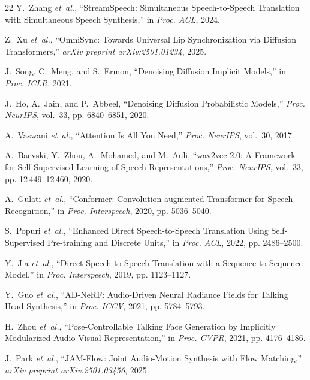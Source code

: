 \documentclass[10pt,journal,compsoc]{IEEEtran}
\begin{document}
\begin{thebibliography}{22}
Y.~Zhang \emph{et~al.}, ``StreamSpeech: Simultaneous Speech-to-Speech Translation with Simultaneous Speech Synthesis,'' in \emph{Proc. ACL}, 2024.

Z.~Xu \emph{et~al.}, ``OmniSync: Towards Universal Lip Synchronization via Diffusion Transformers,'' \emph{arXiv preprint arXiv:2501.01234}, 2025.

J.~Song, C.~Meng, and S.~Ermon, ``Denoising Diffusion Implicit Models,'' in \emph{Proc. ICLR}, 2021.

J.~Ho, A.~Jain, and P.~Abbeel, ``Denoising Diffusion Probabilistic Models,'' \emph{Proc. NeurIPS}, vol.~33, pp. 6840--6851, 2020.

A.~Vaswani \emph{et~al.}, ``Attention Is All You Need,'' \emph{Proc. NeurIPS}, vol.~30, 2017.

A.~Baevski, Y.~Zhou, A.~Mohamed, and M.~Auli, ``wav2vec 2.0: A Framework for Self-Supervised Learning of Speech Representations,'' \emph{Proc. NeurIPS}, vol.~33, pp. 12\,449--12\,460, 2020.

A.~Gulati \emph{et~al.}, ``Conformer: Convolution-augmented Transformer for Speech Recognition,'' in \emph{Proc. Interspeech}, 2020, pp. 5036--5040.

S.~Popuri \emph{et~al.}, ``Enhanced Direct Speech-to-Speech Translation Using Self-Supervised Pre-training and Discrete Units,'' in \emph{Proc. ACL}, 2022, pp. 2486--2500.

Y.~Jia \emph{et~al.}, ``Direct Speech-to-Speech Translation with a Sequence-to-Sequence Model,'' in \emph{Proc. Interspeech}, 2019, pp. 1123--1127.

Y.~Guo \emph{et~al.}, ``AD-NeRF: Audio-Driven Neural Radiance Fields for Talking Head Synthesis,'' in \emph{Proc. ICCV}, 2021, pp. 5784--5793.

H.~Zhou \emph{et~al.}, ``Pose-Controllable Talking Face Generation by Implicitly Modularized Audio-Visual Representation,'' in \emph{Proc. CVPR}, 2021, pp. 4176--4186.

J.~Park \emph{et~al.}, ``JAM-Flow: Joint Audio-Motion Synthesis with Flow Matching,'' \emph{arXiv preprint arXiv:2501.03456}, 2025.

\end{thebibliography}
\end{document}

